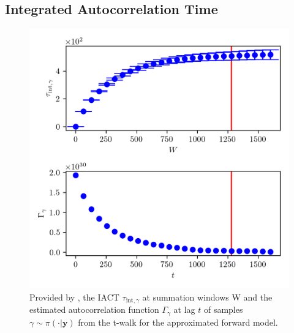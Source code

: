 \subsection{Integrated Autocorrelation Time} 
\begin{figure}[ht!]
	\centering
	\includegraphics{UwerrTauIntTWalk0.png}
	\caption[IACT and autocorrelation function of samples $\gamma \sim \pi(\cdot|\bm{y})$, for approximated model.]{Provided by \cite{drikHesse}, the IACT $\tau_{\text{int},\gamma }$ at summation windows W and the estimated autocorrelation function $\Gamma_{\gamma }$ at lag $t$ of samples $\gamma  \sim \pi( \cdot| \bm{y})$ from the t-walk for the approximated forward model.}
	\label{fig:TWalkIATC1}
\end{figure}
